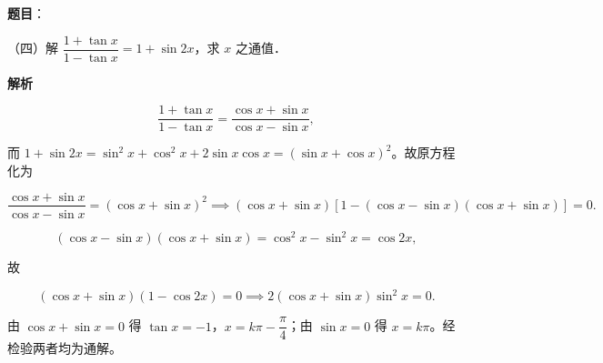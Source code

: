 \begin{answer}

\textbf{题目}：

（四）解 $\dfrac{1+\tan x}{1-\tan x}=1+\sin2x$，求 $x$ 之通值．

\textbf{解析}

\nopagebreak[4]
\[
\frac{1+\tan x}{1-\tan x}=\frac{\cos x+\sin x}{\cos x-\sin x},
\]

而 $1+\sin2x=\sin^2x+\cos^2x+2\sin x\cos x=(\sin x+\cos x)^2$。故原方程化为

\nopagebreak[4]
\[
\frac{\cos x+\sin x}{\cos x-\sin x}=(\cos x+\sin x)^2
\implies (\cos x+\sin x)\left[1-(\cos x-\sin x)(\cos x+\sin x)\right]=0.
\]

\nopagebreak[4]
\[
(\cos x-\sin x)(\cos x+\sin x)=\cos^2x-\sin^2x=\cos2x,
\]

故

\nopagebreak[4]
\[
(\cos x+\sin x)(1-\cos2x)=0
\implies 2(\cos x+\sin x)\sin^2x=0.
\]

由 $\cos x+\sin x=0$ 得 $\tan x=-1$，$x=k\pi-\dfrac\pi4$；由 $\sin x=0$ 得 $x=k\pi$。经检验两者均为通解。


\end{answer}
